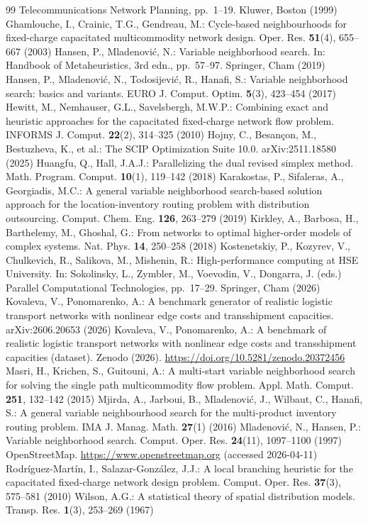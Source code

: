 \documentclass[runningheads]{llncs}
\begin{document}
\begin{thebibliography}{99}
Telecommunications Network Planning, pp.~1--19. Kluwer, Boston (1999)
 Ghamlouche, I., Crainic, T.G., Gendreau, M.:
Cycle-based neighbourhoods for fixed-charge capacitated multicommodity network
design. Oper. Res. \textbf{51}(4), 655--667 (2003)
 Hansen, P., Mladenovi\'c, N.: Variable neighborhood search.
In: Handbook of Metaheuristics, 3rd edn., pp.~57--97. Springer, Cham (2019)
 Hansen, P., Mladenovi\'c, N., Todosijevi\'c, R., Hanafi, S.:
Variable neighborhood search: basics and variants. EURO J. Comput. Optim.
\textbf{5}(3), 423--454 (2017)
 Hewitt, M., Nemhauser, G.L., Savelsbergh, M.W.P.: Combining
exact and heuristic approaches for the capacitated fixed-charge network flow
problem. INFORMS J. Comput. \textbf{22}(2), 314--325 (2010)
 Hojny, C., Besan\c{c}on, M., Bestuzheva, K., et al.: The SCIP
Optimization Suite 10.0. arXiv:2511.18580 (2025)
 Huangfu, Q., Hall, J.A.J.: Parallelizing the dual revised simplex
method. Math. Program. Comput. \textbf{10}(1), 119--142 (2018)
 Karakostas, P., Sifaleras, A., Georgiadis, M.C.: A
general variable neighborhood search-based solution approach for the
location-inventory routing problem with distribution outsourcing. Comput. Chem.
Eng. \textbf{126}, 263--279 (2019)
 Kirkley, A., Barbosa, H., Barthelemy, M., Ghoshal, G.:
From networks to optimal higher-order models of complex systems. Nat. Phys.
\textbf{14}, 250--258 (2018)
 Kostenetskiy, P., Kozyrev, V., Chulkevich, R., Salikova, M.,
Mishenin, R.: High-performance computing at HSE University. In: Sokolinsky, L.,
Zymbler, M., Voevodin, V., Dongarra, J. (eds.) Parallel Computational
Technologies, pp.~17--29. Springer, Cham (2026)
 Kovaleva, V., Ponomarenko, A.: A benchmark generator of
realistic logistic transport networks with nonlinear edge costs and
transshipment capacities. arXiv:2606.20653 (2026)
 Kovaleva, V., Ponomarenko, A.: A benchmark of realistic
logistic transport networks with nonlinear edge costs and transshipment
capacities (dataset). Zenodo (2026).
\url{https://doi.org/10.5281/zenodo.20372456}
 Masri, H., Krichen, S., Guitouni, A.: A multi-start variable
neighborhood search for solving the single path multicommodity flow problem.
Appl. Math. Comput. \textbf{251}, 132--142 (2015)
 Mjirda, A., Jarboui, B., Mladenovi\'c, J., Wilbaut, C.,
Hanafi, S.: A general variable neighbourhood search for the multi-product
inventory routing problem. IMA J. Manag. Math. \textbf{27}(1) (2016)
 Mladenovi\'c, N., Hansen, P.: Variable neighborhood
search. Comput. Oper. Res. \textbf{24}(11), 1097--1100 (1997)
 OpenStreetMap. \url{https://www.openstreetmap.org} (accessed
2026-04-11)
 Rodr\'iguez-Mart\'in, I., Salazar-Gonz\'alez, J.J.: A
local branching heuristic for the capacitated fixed-charge network design
problem. Comput. Oper. Res. \textbf{37}(3), 575--581 (2010)
 Wilson, A.G.: A statistical theory of spatial distribution
models. Transp. Res. \textbf{1}(3), 253--269 (1967)
\end{thebibliography}
\end{document}
